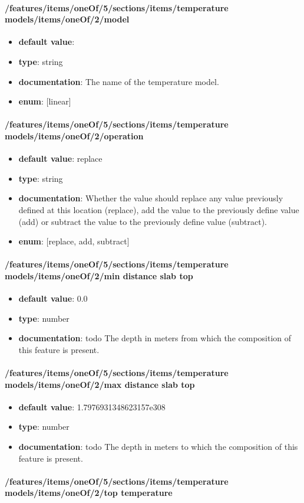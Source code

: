 \paragraph{/features/items/oneOf/5/sections/items/temperature models/items/oneOf/2/model}
\begin{itemize}\item {\bf default value}: 
\item {\bf type}: string
\item {\bf documentation}: The name of the temperature model.
\item {\bf enum}: [linear]\end{itemize}\paragraph{/features/items/oneOf/5/sections/items/temperature models/items/oneOf/2/operation}
\begin{itemize}\item {\bf default value}: replace
\item {\bf type}: string
\item {\bf documentation}: Whether the value should replace any value previously defined at this location (replace), add the value to the previously define value (add) or subtract the value to the previously define value (subtract).
\item {\bf enum}: [replace, add, subtract]\end{itemize}\paragraph{/features/items/oneOf/5/sections/items/temperature models/items/oneOf/2/min distance slab top}
\begin{itemize}\item {\bf default value}: 0.0
\item {\bf type}: number
\item {\bf documentation}: todo The depth in meters from which the composition of this feature is present.
\end{itemize}\paragraph{/features/items/oneOf/5/sections/items/temperature models/items/oneOf/2/max distance slab top}
\begin{itemize}\item {\bf default value}: 1.7976931348623157e308
\item {\bf type}: number
\item {\bf documentation}: todo The depth in meters to which the composition of this feature is present.
\end{itemize}\paragraph{/features/items/oneOf/5/sections/items/temperature models/items/oneOf/2/top temperature}
